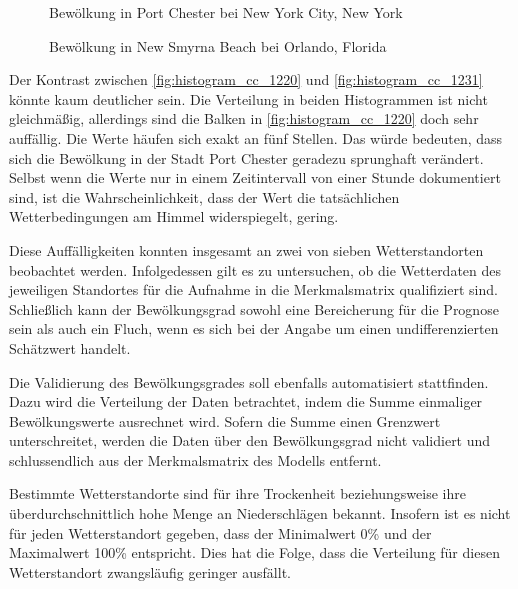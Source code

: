 \documentclass[12pt, a4paper]{article}
\begin{document}
\begin{figure}
\centering
\begin{minipage}[t]{0.45\linewidth}
\centering
\def\svgwidth{210pt}

\caption{Bewölkung in Port Chester bei New York City, New York}
\label{fig:histogram_cc_1220}
\end{minipage}
\hfill
\begin{minipage}[t]{0.45\linewidth}
\centering
\def\svgwidth{200pt}

\caption{Bewölkung in New Smyrna Beach bei Orlando, Florida}
\label{fig:histogram_cc_1231}
\end{minipage}
\end {figure}


Der Kontrast zwischen \autoref{fig:histogram_cc_1220} und \autoref{fig:histogram_cc_1231} könnte kaum deutlicher sein. Die Verteilung in beiden Histogrammen ist nicht gleichmäßig, allerdings sind die Balken in \autoref{fig:histogram_cc_1220} doch sehr auffällig. Die Werte häufen sich exakt an fünf Stellen. Das würde bedeuten, dass sich die Bewölkung in der Stadt Port Chester geradezu sprunghaft verändert. Selbst wenn die Werte nur in einem Zeitintervall von einer Stunde dokumentiert sind, ist die Wahrscheinlichkeit, dass der Wert die tatsächlichen Wetterbedingungen am Himmel widerspiegelt, gering.

Diese Auffälligkeiten konnten insgesamt an zwei von sieben Wetterstandorten beobachtet werden. Infolgedessen gilt es zu untersuchen, ob die Wetterdaten des jeweiligen Standortes für die Aufnahme in die Merkmalsmatrix qualifiziert sind. Schließlich kann der Bewölkungsgrad sowohl eine Bereicherung für die Prognose sein als auch ein Fluch, wenn es sich bei der Angabe um einen undifferenzierten Schätzwert handelt.

Die Validierung des Bewölkungsgrades soll ebenfalls automatisiert stattfinden. Dazu wird die Verteilung der Daten betrachtet, indem die Summe einmaliger Bewölkungswerte ausrechnet wird. Sofern die Summe einen Grenzwert unterschreitet, werden die Daten über den Bewölkungsgrad nicht validiert und schlussendlich aus der Merkmalsmatrix des Modells entfernt. 

Bestimmte Wetterstandorte sind für ihre Trockenheit beziehungsweise ihre überdurchschnittlich hohe Menge an Niederschlägen bekannt. Insofern ist es nicht für jeden Wetterstandort gegeben, dass der Minimalwert 0\% und der Maximalwert 100\% entspricht. Dies hat die Folge, dass die Verteilung für diesen Wetterstandort zwangsläufig geringer ausfällt.
\end{document}
